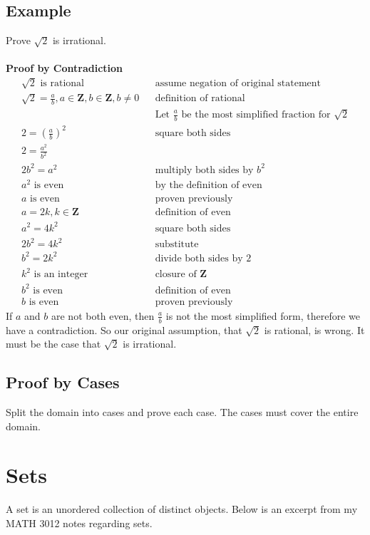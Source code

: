 \documentclass[12pt]{article}
\begin{document}
\subsection{Example}
Prove $\sqrt{2}$ is irrational. \\\\
\textbf{Proof by Contradiction} \\
\begin{align*}
	\sqrt{2} \text{ is rational} && \text{assume negation of original statement} \\
	\sqrt{2} = \frac{a}{b}, a \in \mathbf{Z}, b \in \mathbf{Z}, b \neq 0 && \text{definition of rational} \\
																		 && \text{Let } \frac{a}{b} \text{ be the most simplified fraction for } \sqrt{2} \\ 
	2 = \left(\frac{a}{b}\right)^2 && \text{square both sides} \\
	2 = \frac{a^2}{b^2} \\
	2b^2 = a^2 && \text{multiply both sides by }b^2 \\
	a^2 \text{ is even} && \text{by the definition of even} \\
	a \text{ is even} && \text{proven previously} \\
	a = 2k, k \in \mathbf{Z} && \text{definition of even} \\
	a^2 = 4k^2 && \text{square both sides} \\
	2b^2 = 4k^2 && \text{substitute} \\
	b^2 = 2k^2 && \text{divide both sides by 2} \\
	k^2 \text{ is an integer} && \text{closure of } \mathbf{Z} \\
	b^2 \text{ is even} && \text{definition of even} \\
	b \text{ is even} && \text{proven previously}
\end{align*}
If $a$ and $b$ are not both even, then $\frac{a}{b}$ is not the most simplified form, therefore we have a contradiction. So our original assumption, that $\sqrt{2}$ is rational, is wrong. It must be the case that $\sqrt{2}$ is irrational.
\subsection{Proof by Cases}
Split the domain into cases and prove each case. The cases must cover the entire domain.
\section{Sets}
A set is an unordered collection of distinct objects. Below is an excerpt from my MATH 3012 notes regarding sets.
\end{document}
